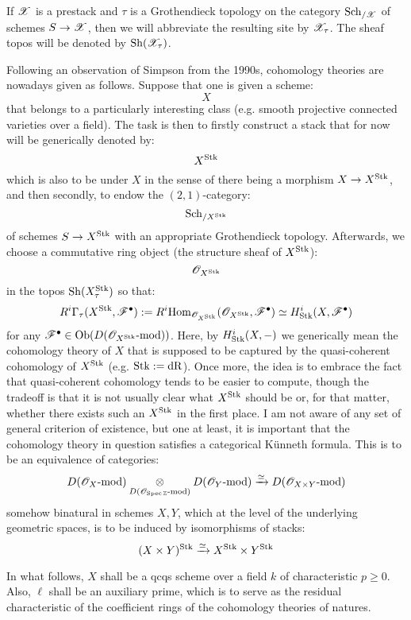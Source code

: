         \begin{convention}
            If $\mathscr{X}$ is a prestack and $\tau$ is a Grothendieck topology on the category $\mathrm{Sch}_{/\mathscr{X}}$ of schemes $S \to \mathscr{X}$, then we will abbreviate the resulting site by $\mathscr{X}_{\tau}$. The sheaf topos will be denoted by $\mathrm{Sh}(\mathscr{X}_{\tau})$.
        \end{convention}
        
        Following an observation of Simpson from the 1990s, cohomology theories are nowadays given as follows. Suppose that one is given a scheme:
            $$X$$
        that belongs to a particularly interesting class (e.g. smooth projective connected varieties over a field). The task is then to firstly construct a stack that for now will be generically denoted by:
            $$X^{\mathrm{Stk}}$$
        which is also to be under $X$ in the sense of there being a morphism $X \to X^{\mathrm{Stk}}$, and then secondly, to endow the $(2, 1)$-category:
            $$\mathrm{Sch}_{/X^{\mathrm{Stk}}}$$
        of schemes $S \to X^{\mathrm{Stk}}$ with an appropriate Grothendieck topology. Afterwards, we choose a commutative ring object (the structure sheaf of $X^{\mathrm{Stk}}$):
            $$\mathscr{O}_{X^{\mathrm{Stk}}}$$
        in the topos $\mathrm{Sh}(X^{\mathrm{Stk}}_{\tau})$ so that:
            $$R^i\Gamma_{\tau}(X^{\mathrm{Stk}}, \mathscr{F}^{\bullet}) := R^i\mathrm{Hom}_{\mathscr{O}_{X^{\mathrm{Stk}}}}(\mathscr{O}_{X^{\mathrm{Stk}}}, \mathscr{F}^{\bullet}) \simeq H^i_{\mathrm{Stk}}(X, \mathscr{F}^{\bullet})$$
        for any $\mathscr{F}^{\bullet} \in \mathrm{Ob}( D(\mathscr{O}_{X^{\mathrm{Stk}}}\text{-}\mathrm{mod}) )$. Here, by $H^i_{\mathrm{Stk}}(X, -)$ we generically mean the cohomology theory of $X$ that is supposed to be captured by the quasi-coherent cohomology of $X^{\mathrm{Stk}}$ (e.g. $\mathrm{Stk} := \mathrm{dR}$). Once more, the idea is to embrace the fact that quasi-coherent cohomology tends to be easier to compute, though the tradeoff is that it is not usually clear what $X^{\mathrm{Stk}}$ should be or, for that matter, whether there exists such an $X^{\mathrm{Stk}}$ in the first place. I am not aware of any set of general criterion of existence, but one at least, it is important that the cohomology theory in question satisfies a categorical K\"unneth formula. This is to be an equivalence of categories:
            $$D(\scrO_X\mod) \tensor_{ D(\scrO_{\Spec \Z}\mod) } D(\scrO_Y\mod) \xrightarrow[]{\cong} D( \scrO_{X \x Y}\mod )$$
        somehow binatural in schemes $X, Y$, which at the level of the underlying geometric spaces, is to be induced by isomorphisms of stacks:
            $$(X \x Y)^{\Stk} \xrightarrow[]{\cong} X^{\Stk} \x Y^{\Stk}$$
        
        \begin{convention}
            In what follows, $X$ shall be a qcqs scheme over a field $k$ of characteristic $p \geq 0$. Also, $\ell$ shall be an auxiliary prime, which is to serve as the residual characteristic of the coefficient rings of the cohomology theories of  natures.
        \end{convention}

